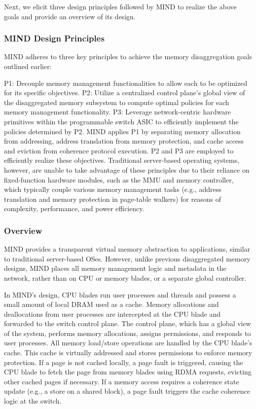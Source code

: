 Next, we elicit three design principles followed by MIND to realize the above goals and provide an overview of its design.

\subsubsection{MIND Design Principles}
MIND adheres to three key principles to achieve the memory disaggregation goals outlined earlier:

P1: Decouple memory management functionalities to allow each to be optimized for its specific objectives.
P2: Utilize a centralized control plane's global view of the disaggregated memory subsystem to compute optimal policies for each memory management functionality.
P3: Leverage network-centric hardware primitives within the programmable switch ASIC to efficiently implement the policies determined by P2.
MIND applies P1 by separating memory allocation from addressing, address translation from memory protection, and cache access and eviction from coherence protocol execution. P2 and P3 are employed to efficiently realize these objectives. Traditional server-based operating systems, however, are unable to take advantage of these principles due to their reliance on fixed-function hardware modules, such as the MMU and memory controller, which typically couple various memory management tasks (e.g., address translation and memory protection in page-table walkers) for reasons of complexity, performance, and power efficiency.

\subsubsection{Overview}
MIND provides a transparent virtual memory abstraction to applications, similar to traditional server-based OSes. However, unlike previous disaggregated memory designs, MIND places all memory management logic and metadata in the network, rather than on CPU or memory blades, or a separate global controller.

In MIND's design, CPU blades run user processes and threads and possess a small amount of local DRAM used as a cache. Memory allocations and deallocations from user processes are intercepted at the CPU blade and forwarded to the switch control plane. The control plane, which has a global view of the system, performs memory allocations, assigns permissions, and responds to user processes. All memory load/store operations are handled by the CPU blade's cache. This cache is virtually addressed and stores permissions to enforce memory protection. If a page is not cached locally, a page fault is triggered, causing the CPU blade to fetch the page from memory blades using RDMA requests, evicting other cached pages if necessary. If a memory access requires a coherence state update (e.g., a store on a shared block), a page fault triggers the cache coherence logic at the switch.

